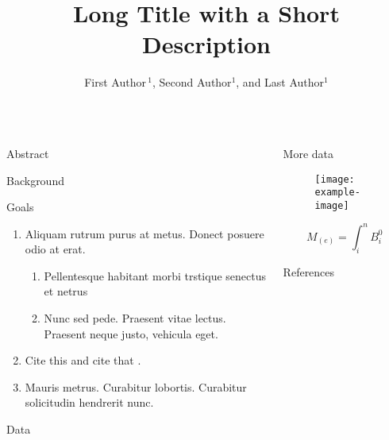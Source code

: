 \documentclass{beamer}
\title[ShortName]{Long Title with a Short Description}
\author{First Author\,$^{1}$,  Second Author$^{1}$, and Last Author$^{1}$}
\institute[Address]{
$^{1}$
	Albert-Ludwigs-University Freiburg, 
	Division or Department,\\
	Name of the First Group, 
	Address of the First Group, 79110 Freiburg
}
\begin{document}
\begin{frame}[t]
\begin{columns}[t]
	\begin{column2}
		\begin{block}{Abstract}
\lipsum[66]
		\end{block}

		\begin{block}{Background}
\lipsum[3]
		\end{block}

		\begin{block}{Goals} 
\lipsum[66]
\begin{enumerate}
\item Aliquam rutrum purus at metus. Donect posuere odio at erat.
	\begin{enumerate}
	\item Pellentesque habitant morbi trstique senectus et netrus
	\item Nunc sed pede. Praesent vitae lectus. Praesent neque justo, vehicula eget.
	\end{enumerate}
\item Cite this \cite{Smith:2013jd} and cite that \cite{Smith:2012qr}.
\item Mauris metrus. Curabitur lobortis. Curabitur solicitudin hendrerit nunc.
\end{enumerate}
		\end{block}

		\begin{block}{Data}
\lipsum[68]
		\end{block}
	\end{column2}
	\begin{column2}	
		\begin{block}{More data} 
\lipsum[66]

\begin{figure}
	\centering
	\texttt{[image: example-image]}
	\label{referencetoimage}
	\caption{\lipsum[66]}
\end{figure}
\lipsum[68]

\begin{equation}
 M_(e) = \int_{i}^{n} B_i^{0}
\end{equation}

\lipsum[18]
		\end{block}
%		
		\begin{block}{References} 
			\fontsize{14}{10}\selectfont
			
		\end{block}
	\end{column2}
\end{columns}
\end{frame}
\end{document}

